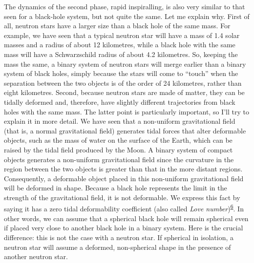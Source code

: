 The dynamics of the second phase, rapid inspiralling, is also very similar to that seen
for a black-hole system, but not quite the same. Let me explain why. First of all,
neutron stars have a larger size than a black hole of the same mass. For example, we
have seen that a typical neutron star will have a mass of 1.4 solar masses and a radius
of about 12 kilometres, while a black hole with the same mass will have a Schwarzschild
radius of about 4.2 kilometres. So, keeping the mass the same, a binary system of
neutron stars will merge earlier than a binary system of black holes, simply because the
stars will come to ``touch'' when the separation between the two objects is of the order
of 24 kilometres, rather than eight kilometres. Second, because neutron stars are made
of matter, they can be tidally deformed and, therefore, have slightly different
trajectories from black holes with the same mass. The latter point is particularly
important, so I'll try to explain it in more detail. We have seen that a non-uniform
gravitational field (that is, a normal gravitational field) generates tidal
forces that alter deformable objects, such as the mass of water on
the surface of the Earth, which can be raised by the tidal field produced by the
Moon. A binary system of compact objects generates a non-uniform
gravitational field since the curvature in the region between the two objects is greater
than that in the more distant regions. Consequently, a deformable object placed in this
non-uniform gravitational field will be deformed in shape. Because a black hole
represents the limit in the strength of the gravitational field, it is not deformable.
We express this fact by saying it has a zero tidal deformability coefficient (also
called \emph{Love number})\textsuperscript{\hyperlink{note:08-06}{6}}. In other words, we can
assume that a spherical black hole will remain spherical even if placed very close to
another black hole in a binary system. Here is the crucial difference: this is not the
case with a neutron star. If spherical in isolation, a neutron star will assume a
deformed, non-spherical shape in the presence of another neutron star.

